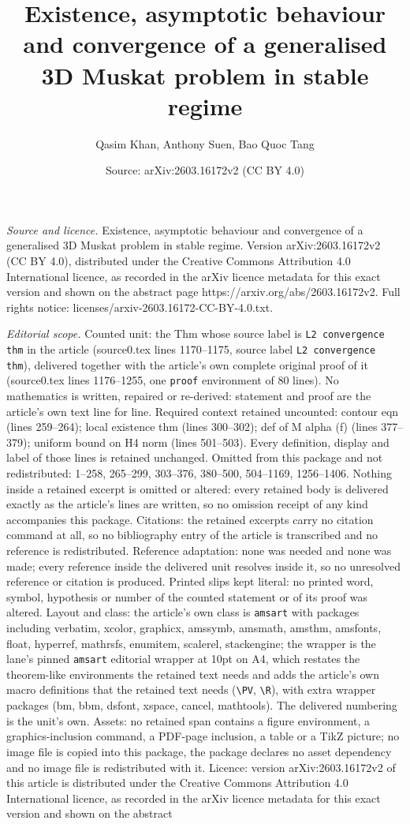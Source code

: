 \documentclass[10pt,a4paper]{amsart}
\title[Existence, asymptotic behaviour and convergence of a general]{Existence, asymptotic behaviour and convergence of a generalised 3D Muskat problem in stable regime}
\author{Qasim Khan, Anthony Suen, Bao Quoc Tang}
\date{Source: arXiv:2603.16172v2 (CC BY 4.0)}
\begin{document}
\maketitle

\noindent\emph{Source and licence.} Existence, asymptotic behaviour and convergence of a generalised 3D Muskat problem in stable regime. Version arXiv:2603.16172v2 (CC BY 4.0), distributed under the Creative Commons Attribution 4.0 International licence, as recorded in the arXiv licence metadata for this exact version and shown on the abstract page https://arxiv.org/abs/2603.16172v2. Full rights notice: licenses/arxiv-2603.16172-CC-BY-4.0.txt.\par\smallskip

\noindent\textit{Editorial scope.} Counted unit: the Thm whose source label is \texttt{L2 convergence thm} in the article (source0.tex lines 1170--1175, source label \texttt{L2 convergence thm}), delivered together with the article's own complete original proof of it (source0.tex lines 1176--1255, one \texttt{proof} environment of 80 lines). No mathematics is written, repaired or re-derived: statement and proof are the article's own text line for line. Required context retained uncounted: contour eqn (lines 259--264); local existence thm (lines 300--302); def of M alpha (f) (lines 377--379); uniform bound on H4 norm (lines 501--503). Every definition, display and label of those lines is retained unchanged. Omitted from this package and not redistributed: 1--258, 265--299, 303--376, 380--500, 504--1169, 1256--1406. Nothing inside a retained excerpt is omitted or altered: every retained body is delivered exactly as the article's lines are written, so no omission receipt of any kind accompanies this package. Citations: the retained excerpts carry no citation command at all, so no bibliography entry of the article is transcribed and no reference is redistributed. Reference adaptation: none was needed and none was made; every reference inside the delivered unit resolves inside it, so no unresolved reference or citation is produced. Printed slips kept literal: no printed word, symbol, hypothesis or number of the counted statement or of its proof was altered. Layout and class: the article's own class is \texttt{amsart} with packages including verbatim, xcolor, graphicx, amssymb, amsmath, amsthm, amsfonts, float, hyperref, mathrsfs, enumitem, scalerel, stackengine; the wrapper is the lane's pinned \texttt{amsart} editorial wrapper at 10pt on A4, which restates the theorem-like environments the retained text needs and adds the article's own macro definitions that the retained text needs (\texttt{\textbackslash PV}, \texttt{\textbackslash R}), with extra wrapper packages (bm, bbm, dsfont, xspace, cancel, mathtools). The delivered numbering is the unit's own. Assets: no retained span contains a figure environment, a graphics-inclusion command, a PDF-page inclusion, a table or a TikZ picture; no image file is copied into this package, the package declares no asset dependency and no image file is redistributed with it. Licence: version arXiv:2603.16172v2 of this article is distributed under the Creative Commons Attribution 4.0 International licence, as recorded in the arXiv licence metadata for this exact version and shown on the abstract 
\end{document}
